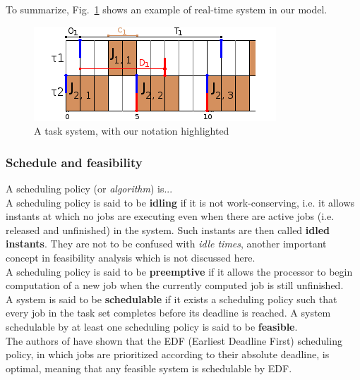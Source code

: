 \documentclass[a4paper,10pt]{article}
\begin{document}
        To summarize, Fig.~\ref{fig:rt_ex} shows an example of real-time system in our model.

        \begin{figure}[H]
        \begin{center}
            \includegraphics{figs/RTsystem_example.png}
            \caption{A task system, with our notation highlighted}
            \label{fig:rt_ex}
        \end{center}
        \end{figure}


        \subsubsection{Schedule and feasibility}

        A scheduling policy (or \emph{algorithm}) is...\\

        A scheduling policy is said to be \textbf{idling} if it is not work-conserving, i.e. it allows instants at which no jobs are executing even when there are active jobs (i.e. released and unfinished) in the system. Such instants are then called \textbf{idled instants}. They are not to be confused with \emph{idle times}, another important concept in feasibility analysis which is not discussed here.\\

        A scheduling policy is said to be \textbf{preemptive} if it allows the processor to begin computation of a new job when the currently computed job is still unfinished.\\

        A system is said to be \textbf{schedulable} if it exists a scheduling policy such that every job in the task set completes before its deadline is reached. A system schedulable by at least one scheduling policy is said to be \textbf{feasible}.\\

        The authors of \cite{liu1973scheduling} have shown that the EDF (Earliest Deadline First) scheduling policy, in which jobs are prioritized according to their absolute deadline, is optimal, meaning that any feasible system is schedulable by EDF.
\end{document}
